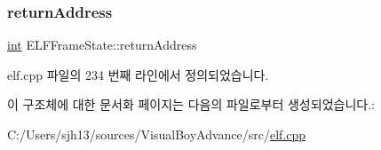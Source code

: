 \subsubsection{\texorpdfstring{return\+Address}{returnAddress}}
{\footnotesize\ttfamily \mbox{\hyperlink{_util_8cpp_a0ef32aa8672df19503a49fab2d0c8071}{int}} E\+L\+F\+Frame\+State\+::return\+Address}



elf.\+cpp 파일의 234 번째 라인에서 정의되었습니다.



이 구조체에 대한 문서화 페이지는 다음의 파일로부터 생성되었습니다.\+:\begin{DoxyCompactItemize}
\item 
C\+:/\+Users/sjh13/sources/\+Visual\+Boy\+Advance/src/\mbox{\hyperlink{elf_8cpp}{elf.\+cpp}}\end{DoxyCompactItemize}
